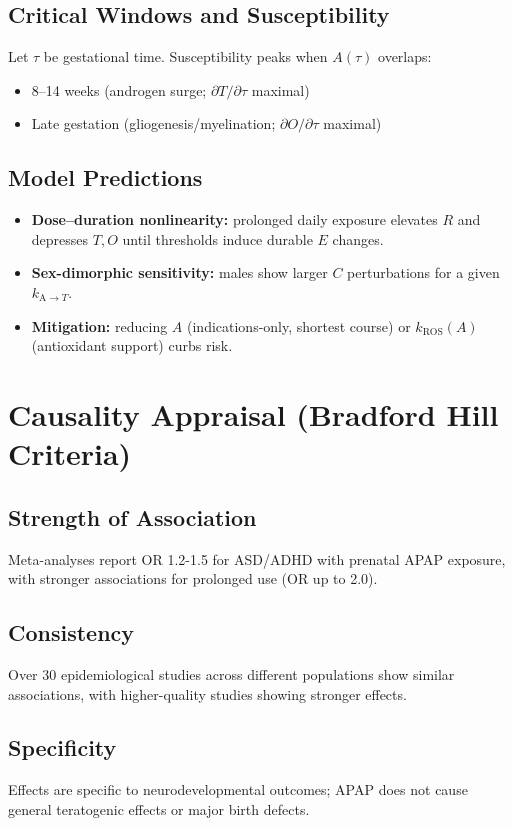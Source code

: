 \documentclass[12pt]{article}
\begin{document}
\subsection{Critical Windows and Susceptibility}
Let $\tau$ be gestational time. Susceptibility peaks when $A(\tau)$ overlaps:
\begin{itemize}
  \item 8--14 weeks (androgen surge; $\partial T/\partial \tau$ maximal)
  \item Late gestation (gliogenesis/myelination; $\partial O/\partial \tau$ maximal)
\end{itemize}

\subsection{Model Predictions}
\begin{itemize}
  \item \textbf{Dose--duration nonlinearity:} prolonged daily exposure elevates $R$ and depresses $T,O$ until thresholds induce durable $E$ changes.
  \item \textbf{Sex-dimorphic sensitivity:} males show larger $C$ perturbations for a given $k_{\mathrm{A}\to T}$.
  \item \textbf{Mitigation:} reducing $A$ (indications-only, shortest course) or $k_{\mathrm{ROS}}(A)$ (antioxidant support) curbs risk.
\end{itemize}

\section{Causality Appraisal (Bradford Hill Criteria)}

\subsection{Strength of Association}
Meta-analyses report OR 1.2-1.5 for ASD/ADHD with prenatal APAP exposure, with stronger associations for prolonged use (OR up to 2.0).

\subsection{Consistency}
Over 30 epidemiological studies across different populations show similar associations, with higher-quality studies showing stronger effects.

\subsection{Specificity}
Effects are specific to neurodevelopmental outcomes; APAP does not cause general teratogenic effects or major birth defects.
\end{document}
